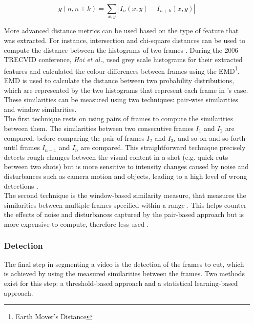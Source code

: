\begin{equation}
\label{eq:absolutevalue}
    g(n,n+k) = \sum _{x,y} | I_n(x,y) - I_{n+k}(x,y) |
\end{equation}

More advanced distance metrics can be used based on the type of feature that was extracted. For instance, intersection and chi-square distances can be used to compute the distance between the histograms of two frames \cite[p.197]{camara2007shot}. During the 2006 TRECVID conference, \textit{Hoi et al.}, used grey scale histograms for their extracted features and calculated the colour differences between frames using the EMD\footnote{Earth Mover's Distance}. EMD is used to calculate the distance between two probability distributions, which are represented by the two histograms that represent each frame in \cite[p.2]{hoi2006trecvid06}'s case. These similarities can be measured using two techniques: pair-wise similarities and window similarities.\\

The first technique rests on using pairs of frames to compute the similarities between them. The similarities between two consecutive frames $I_1$ and $I_2$ are compared, before comparing the pair of frames $I_2$ and $I_3$, and so on and so forth until frames $I_{n-1}$ and $I_n$ are compared. This straightforward technique precisely detects rough changes between the visual content in a shot (e.g. quick cuts between two shots) but is more sensitive to intensity changes caused by noise and disturbances such as camera motion and objects, leading to a high level of wrong detections \cite{janwe2013video}.\\

The second technique is the window-based similarity measure, that measures the similarities between multiple frames specified within a range \cite{cernekova2006information}. This helps counter the effects of noise and disturbances captured by the pair-based approach but is more expensive to compute, therefore less used \cite{hu2011survey}.

\subsubsection{Detection}
The final step in segmenting a video is the detection of the frames to cut, which is achieved by using the measured similarities between the frames. Two methods exist for this step: a threshold-based approach and a statistical learning-based approach.\\

